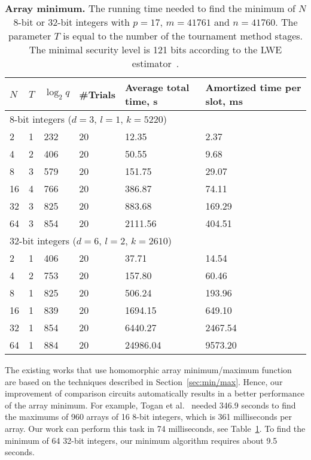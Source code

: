 \begin{table}[h]
  \centering
  \begin{tabular*}{.45\textwidth}{ p{0.2cm} p{0.2cm} p{0.8cm} p{0.9cm} p{1.5cm} p{2.0cm}}
    \toprule
    $N$     & $T$   & $\log_2 q$    & \#Trials  & Average total time, s    & Amortized time per slot, ms \\
    \midrule
    \multicolumn{6}{l}{8-bit integers ($d=3$, $l=1$, $k=5220$)} \\
    \cmidrule(lr){1-6}
    2       & 1     & 232           & 20        & 12.35     & 2.37 \\
    4       & 2     & 406           & 20        & 50.55     & 9.68 \\
    8       & 3     & 579           & 20        & 151.75    & 29.07 \\
    16      & 4     & 766           & 20        & 386.87    & 74.11 \\
    32      & 3     & 825           & 20        & 883.68    & 169.29 \\
    64      & 3     & 854           & 20        & 2111.56   & 404.51 \\
    \midrule
    \multicolumn{6}{l}{32-bit integers ($d=6$, $l=2$, $k=2610$)} \\
    \cmidrule(lr){1-6}
    2       & 1     & 406           & 20        & 37.71     & 14.54 \\
    4       & 2     & 753           & 20        & 157.80    & 60.46 \\
    8       & 1     & 825           & 20        & 506.24    & 193.96 \\
    16      & 1     & 839           & 20        & 1694.15   & 649.10 \\
    32      & 1     & 854           & 20        & 6440.27   & 2467.54 \\
    64      & 1     & 884           & 20        & 24986.04  & 9573.20 \\
    \bottomrule
  \end{tabular*}
  \caption{\textbf{Array minimum.} The running time needed to find the minimum of $N$ 8-bit or 32-bit integers with $p=17$, $m=41761$ and $n=41760$. The parameter $T$ is equal to the number of the tournament method stages. The minimal security level is 121 bits according to the LWE estimator~\cite{lwe_estimator}.}
  \label{table:minimum_circuit_results}
\end{table}

The existing works that use homomorphic array minimum/maximum function~\cite{TMP15,PoPETS:SFR20} are based on the techniques described in Section~\ref{sec:min/max}.
Hence, our improvement of comparison circuits automatically results in a better performance of the array minimum.  
For example, Togan et al.~\cite{TMP15} needed 346.9 seconds to find the maximums of 960 arrays of 16 8-bit integers, which is 361 milliseconds per array.
Our work can perform this task in 74 milliseconds, see Table~\ref{table:minimum_circuit_results}.
To find the minimum of 64 32-bit integers, our minimum algorithm requires about 9.5 seconds.

